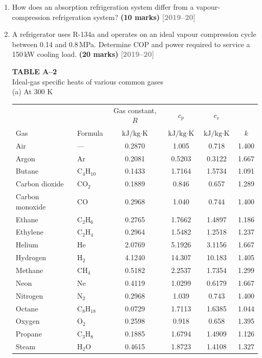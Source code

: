 \documentclass[12pt,a3paper]{article}
\newcommand{\yr}[1]{\hfill\textcolor{gray}{\small\textbf{[#1]}}}
\newcommand{\mk}[1]{\textcolor{orange!70!black}{\small\textbf{(#1 marks)}}}
\begin{document}
\begin{enumerate}
\item \label{qlabel:A3-Q5}
How does an absorption refrigeration system differ from a vapour-compression refrigeration system? \mk{10}
\yr{2019--20}





\item \label{qlabel:A3-Q6}
A refrigerator uses R-134a and operates on an ideal vapour compression cycle between 0.14 and 0.8\,MPa. Determine COP and power required to service a 150\,kW cooling load. \mk{20}
\yr{2019--20}


\noindent\textbf{\Large TABLE A--2} \\
\noindent Ideal-gas specific heats of various common gases \\
\noindent (a) At 300 K
\vspace{0.3cm}

\begin{center}
\begin{tabular}{llcccc}
\toprule\toprule
& & Gas constant, $R$ & $c_p$ & $c_v$ & \\
Gas & Formula & $\text{kJ/kg}\cdot\text{K}$ & $\text{kJ/kg}\cdot\text{K}$ & $\text{kJ/kg}\cdot\text{K}$ & $k$ \\
\midrule
Air & --- & 0.2870 & 1.005 & 0.718 & 1.400 \\
Argon & Ar & 0.2081 & 0.5203 & 0.3122 & 1.667 \\
Butane & $\mathrm{C_4H_{10}}$ & 0.1433 & 1.7164 & 1.5734 & 1.091 \\
Carbon dioxide & $\mathrm{CO_2}$ & 0.1889 & 0.846 & 0.657 & 1.289 \\
Carbon monoxide & CO & 0.2968 & 1.040 & 0.744 & 1.400 \\
Ethane & $\mathrm{C_2H_6}$ & 0.2765 & 1.7662 & 1.4897 & 1.186 \\
Ethylene & $\mathrm{C_2H_4}$ & 0.2964 & 1.5482 & 1.2518 & 1.237 \\
Helium & He & 2.0769 & 5.1926 & 3.1156 & 1.667 \\
Hydrogen & $\mathrm{H_2}$ & 4.1240 & 14.307 & 10.183 & 1.405 \\
Methane & $\mathrm{CH_4}$ & 0.5182 & 2.2537 & 1.7354 & 1.299 \\
Neon & Ne & 0.4119 & 1.0299 & 0.6179 & 1.667 \\
Nitrogen & $\mathrm{N_2}$ & 0.2968 & 1.039 & 0.743 & 1.400 \\
Octane & $\mathrm{C_8H_{18}}$ & 0.0729 & 1.7113 & 1.6385 & 1.044 \\
Oxygen & $\mathrm{O_2}$ & 0.2598 & 0.918 & 0.658 & 1.395 \\
Propane & $\mathrm{C_3H_8}$ & 0.1885 & 1.6794 & 1.4909 & 1.126 \\
Steam & $\mathrm{H_2O}$ & 0.4615 & 1.8723 & 1.4108 & 1.327 \\
\bottomrule\bottomrule
\end{tabular}
\end{center}


\end{enumerate}
\end{document}
